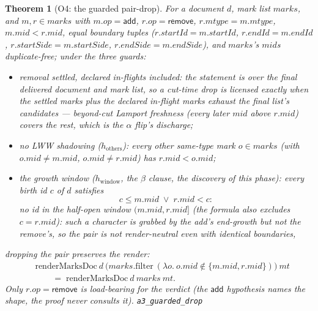 \documentclass[11pt]{article}
\newtheorem{theorem}{Theorem}[section]
\newcommand{\lean}[1]{\texttt{#1}}
\begin{document}
\begin{theorem}[O4: the guarded pair-drop]
\label{thm:a3drop}
For a document $d$, mark list $\mathit{marks}$, and $m, r \in
\mathit{marks}$ with $m.\mathit{op} = \mathsf{add}$, $r.\mathit{op}
= \mathsf{remove}$, $r.\mathit{mtype} = m.\mathit{mtype}$,
$m.\mathit{mid} < r.\mathit{mid}$, equal boundary tuples
($r.\mathit{startId} = m.\mathit{startId}$, $r.\mathit{endId} =
m.\mathit{endId}$, $r.\mathit{startSide} = m.\mathit{startSide}$,
$r.\mathit{endSide} = m.\mathit{endSide}$), and
$\mathit{marks}$'s $\mathit{mid}$s duplicate-free; under the three
guards:
\begin{itemize}[leftmargin=2em]
\item[(G1)] \emph{removal settled, declared in-flights included}:
  the statement is over the \emph{final delivered} document and mark
  list, so a cut-time drop is licensed exactly when the settled
  marks plus the declared in-flight marks exhaust the final list's
  candidates --- beyond-cut Lamport freshness (every later
  $\mathit{mid}$ above $r.\mathit{mid}$) covers the rest, which is
  the $\alpha$ flip's discharge;
\item[(G2)] \emph{no LWW shadowing} ($h_{\mathrm{others}}$): every
  other same-type mark $o \in \mathit{marks}$ (with $o.\mathit{mid}
  \ne m.\mathit{mid}$, $o.\mathit{mid} \ne r.\mathit{mid}$) has
  $r.\mathit{mid} < o.\mathit{mid}$;
\item[(G3)] \emph{the growth window} ($h_{\mathrm{window}}$, the
  $\beta$ clause, the discovery of this phase): every birth id $c$
  of $d$ satisfies
  \[
    c \le m.\mathit{mid} \;\vee\; r.\mathit{mid} < c :
  \]
  \emph{no id in the half-open window} $(m.\mathit{mid},
  r.\mathit{mid}]$ (the formula also excludes $c = r.\mathit{mid}$):
  such a character is grabbed by the add's end-growth but not
  the remove's, so the pair is not render-neutral even with
  identical boundaries,
\end{itemize}
dropping the pair preserves the render:
\[
\begin{aligned}
  &\mathrm{renderMarksDoc}\ d\
  \bigl(\mathit{marks}.\mathrm{filter}\ (\lambda o.\ o.\mathit{mid}
  \notin \{m.\mathit{mid}, r.\mathit{mid}\})\bigr)\ \mathit{mt} \\
  &\qquad=\; \mathrm{renderMarksDoc}\ d\ \mathit{marks}\ \mathit{mt} .
\end{aligned}
\]
Only $r.\mathit{op} = \mathsf{remove}$ is load-bearing for the
verdict (the $\mathsf{add}$ hypothesis names the shape, the proof
never consults it).
\hfill\lean{a3\_guarded\_drop}
\end{theorem}
\end{document}
